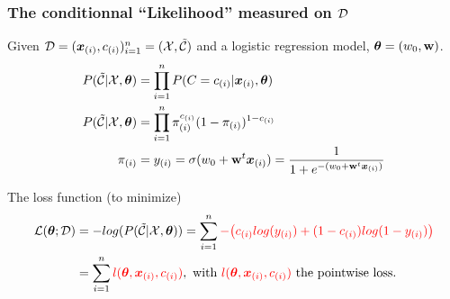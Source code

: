   
\begin{frame}
  \frametitle{The conditionnal ``Likelihood'' measured on $\mathcal{D}$}
     Given $\mathcal{D} = (\boldsymbol{x}_{(i)},{c}_{(i)})_{i=1}^n = (\mathcal{X},\tilde{\mathcal{C}})$ and a logistic regression model, $\boldsymbol{\theta} =  (w_0, \mathbf{w})$. 
     \begin{align*}
       P(\tilde{\mathcal{C}} | \mathcal{X}, \boldsymbol{\theta}) &= \prod_{i=1}^n P({C} = {c}_{(i)}| \boldsymbol{x}_{(i)}, \boldsymbol{\theta}) \\
       P(\tilde{\mathcal{C}} | \mathcal{X}, \boldsymbol{\theta}) &= \prod_{i=1}^n\pi_{(i)}^{{c}_{(i)}} (1-\pi_{(i)})^{1-{c}_{(i)}}\\
       \pi_{(i)} &= y_{(i)} = \sigma(w_0 + \mathbf{w}^t\boldsymbol{x}_{(i)})  = \frac{1}{1+e^{-(w_0 + \mathbf{w}^t\boldsymbol{x}_{(i)})}}
     \end{align*}
     \begin{block}{The loss function (to minimize)}
       \begin{align*}
         \mathcal{L}(\boldsymbol{\theta};\mathcal{D}) &= - log(P(\tilde{\mathcal{C}} | \mathcal{X}, \boldsymbol{\theta}) ) =  \sum_{i=1}^n  {\color{red} - \big(  {c}_{(i)} log(y_{(i)} )+ (1-{c}_{(i)}) log(1-y_{(i)})  \big)}\\
                   &= \sum_{i=1}^n  {\color{red} l(\boldsymbol{\theta},\boldsymbol{x}_{(i)},{c}_{(i)}) }, \textrm{ with } {\color{red} \ensuremath{l}(\ensuremath{\boldsymbol{\theta}},\ensuremath{\boldsymbol{x}_{(i)}},\ensuremath{{c}_{(i)}})} \textrm{ the pointwise loss.}
       \end{align*}
     \end{block}
\end{frame}
